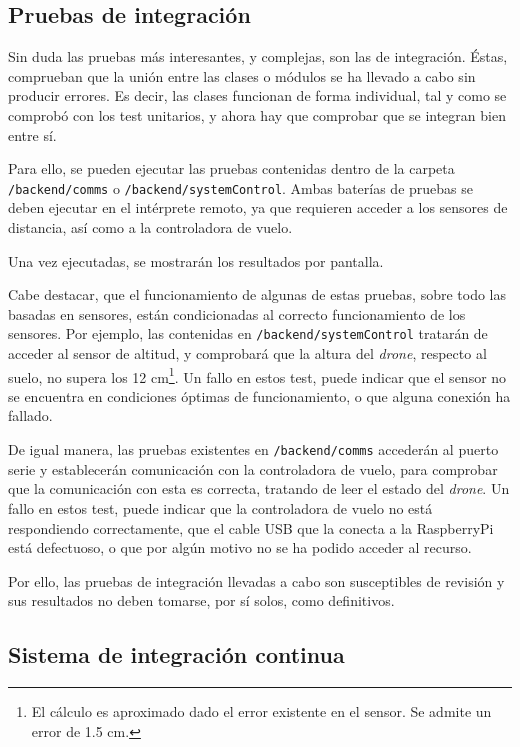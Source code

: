\subsection{Pruebas de integración}

Sin duda las pruebas más interesantes, y complejas, son las de integración. Éstas, comprueban que la unión entre las clases o módulos se ha llevado a cabo sin producir errores. Es decir, las clases funcionan de forma individual, tal y como se comprobó con los test unitarios, y ahora hay que comprobar que se integran bien entre sí. 

Para ello, se pueden ejecutar las pruebas contenidas dentro de la carpeta \texttt{/backend/comms} o \texttt{/backend/systemControl}. Ambas baterías de pruebas se deben ejecutar en el intérprete remoto, ya que requieren acceder a los sensores de distancia, así como a la controladora de vuelo. 

Una vez ejecutadas, se mostrarán los resultados por pantalla. 

Cabe destacar, que el funcionamiento de algunas de estas pruebas, sobre todo las basadas en sensores, están condicionadas al correcto funcionamiento de los sensores. Por ejemplo, las contenidas en \texttt{/backend/systemControl} tratarán de acceder al sensor de altitud, y comprobará que la altura del \emph{drone}, respecto al suelo, no supera los 12 cm\footnote{El cálculo es aproximado dado el error existente en el sensor. Se admite un error de 1.5 cm.}. Un fallo en estos test, puede indicar que el sensor no se encuentra en condiciones óptimas de funcionamiento, o que alguna conexión ha fallado. 

De igual manera, las pruebas existentes en \texttt{/backend/comms} accederán al puerto serie y establecerán comunicación con la controladora de vuelo, para comprobar que la comunicación con esta es correcta, tratando de leer el estado del \emph{drone}. Un fallo en estos test, puede indicar que la controladora de vuelo no está respondiendo correctamente, que el cable USB que la conecta a la RaspberryPi está defectuoso, o que por algún motivo no se ha podido acceder al recurso.

Por ello, las pruebas de integración llevadas a cabo son susceptibles de revisión y sus resultados no deben tomarse, por sí solos, como definitivos. 


\subsection{Sistema de integración continua}


